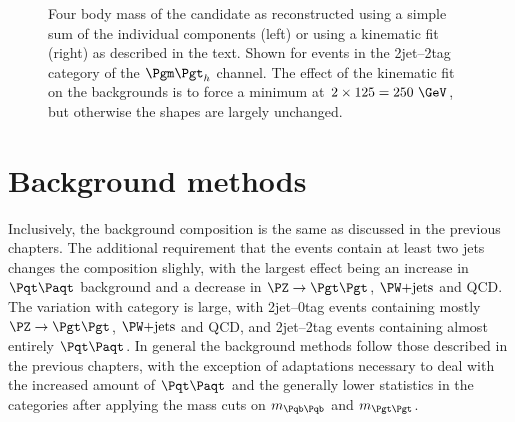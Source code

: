 \begin{figure}
\begin{center}

\end{center}
\caption{
Four body mass of the candidate \PH as reconstructed using a simple sum of the
individual components (left) or using a kinematic fit (right) as
described in the text. Shown for events in the 2jet--2tag category of the
$\mutau$ channel. The effect of the kinematic fit on the backgrounds is to force
a minimum at $2\times125=250~\GeV$, but otherwise the shapes are largely
unchanged.}
\label{fig:kinfitvsmttbbstacked}
\end{figure} 

\section{Background methods}
\label{sec:Hhhbackgrounds}

Inclusively, the background composition is the same as discussed in the previous
chapters. The additional requirement that the events contain at least two jets
changes the composition slighly, with the largest effect being an increase in
$\ttbar$ background and a decrease in $\ZToTauTau$, $\WJets$ and QCD. The
variation with category is large, with 2jet--0tag events containing mostly
$\ZToTauTau$, $\WJets$ and QCD, and 2jet--2tag events containing almost entirely
$\ttbar$. In general the background methods follow those described in the
previous chapters, with the exception of adaptations necessary to deal with the
increased amount of $\ttbar$ and the generally lower statistics in the
categories after applying the mass cuts on $m_{\Pqb\Pqb}$ and $m_{\Pgt\Pgt}$.

